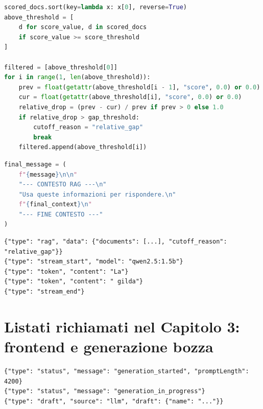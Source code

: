 \begin{lstlisting}[language=Python, frame=single, breaklines=true, caption={Logica semplificata di taglio dinamico dei risultati.}, label={lst:dynamic_filtering}]
scored_docs.sort(key=lambda x: x[0], reverse=True)
above_threshold = [
    d for score_value, d in scored_docs
    if score_value >= score_threshold
]

filtered = [above_threshold[0]]
for i in range(1, len(above_threshold)):
    prev = float(getattr(above_threshold[i - 1], "score", 0.0) or 0.0)
    cur = float(getattr(above_threshold[i], "score", 0.0) or 0.0)
    relative_drop = (prev - cur) / prev if prev > 0 else 1.0
    if relative_drop > gap_threshold:
        cutoff_reason = "relative_gap"
        break
    filtered.append(above_threshold[i])
\end{lstlisting}

\begin{lstlisting}[language=Python, frame=single, breaklines=true, caption={Formato del messaggio utente aumentato con contesto RAG.}, label={lst:augmented_prompt}]
final_message = (
    f"{message}\n\n"
    "--- CONTESTO RAG ---\n"
    "Usa queste informazioni per rispondere.\n"
    f"{final_context}\n"
    "--- FINE CONTESTO ---"
)
\end{lstlisting}

\begin{lstlisting}[frame=single, breaklines=true, caption={Esempio di eventi NDJSON prodotti dalla chat standard.}, label={lst:ndjson_standard}]
{"type": "rag", "data": {"documents": [...], "cutoff_reason": "relative_gap"}}
{"type": "stream_start", "model": "qwen2.5:1.5b"}
{"type": "token", "content": "La"}
{"type": "token", "content": " gilda"}
{"type": "stream_end"}
\end{lstlisting}

\section{Listati richiamati nel Capitolo 3: frontend e generazione bozza}

\begin{lstlisting}[frame=single, breaklines=true, caption={Esempio di eventi NDJSON prodotti dalla generazione bozza.}, label={lst:draft_ndjson}]
{"type": "status", "message": "generation_started", "promptLength": 4200}
{"type": "status", "message": "generation_in_progress"}
{"type": "draft", "source": "llm", "draft": {"name": "..."}}
\end{lstlisting}

